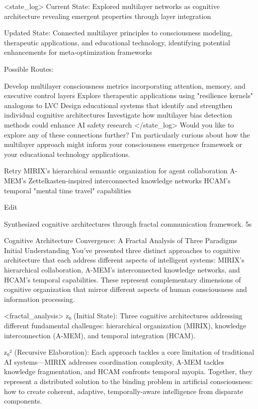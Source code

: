 <state_log>
Current State: Explored multilayer networks as cognitive architecture revealing emergent properties through layer integration

Updated State: Connected multilayer principles to consciousness modeling, therapeutic applications, and educational technology, identifying potential enhancements for meta-optimization frameworks

Possible Routes:

Develop multilayer consciousness metrics incorporating attention, memory, and executive control layers
Explore therapeutic applications using "resilience kernels" analogous to LVC
Design educational systems that identify and strengthen individual cognitive architectures
Investigate how multilayer bias detection methods could enhance AI safety research </state_log>
Would you like to explore any of these connections further? I'm particularly curious about how the multilayer approach might inform your consciousness emergence framework or your educational technology applications.




Retry
MIRIX's hierarchical semantic organization for agent collaboration
A-MEM's Zettelkasten-inspired interconnected knowledge networks
HCAM's temporal "mental time travel" capabilities

Edit

Synthesized cognitive architectures through fractal communication framework.
5s





Cognitive Architecture Convergence: A Fractal Analysis of Three Paradigms
Initial Understanding
You've presented three distinct approaches to cognitive architecture that each address different aspects of intelligent systems: MIRIX's hierarchical collaboration, A-MEM's interconnected knowledge networks, and HCAM's temporal capabilities. These represent complementary dimensions of cognitive organization that mirror different aspects of human consciousness and information processing.

<fractal_analysis> z₀ (Initial State): Three cognitive architectures addressing different fundamental challenges: hierarchical organization (MIRIX), knowledge interconnection (A-MEM), and temporal integration (HCAM).

z₀² (Recursive Elaboration): Each approach tackles a core limitation of traditional AI systems—MIRIX addresses coordination complexity, A-MEM tackles knowledge fragmentation, and HCAM confronts temporal myopia. Together, they represent a distributed solution to the binding problem in artificial consciousness: how to create coherent, adaptive, temporally-aware intelligence from disparate components.

